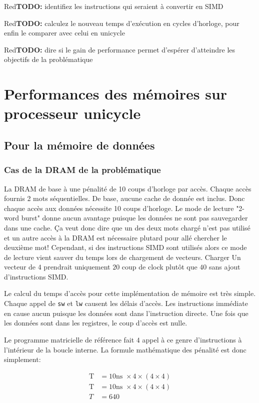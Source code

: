 \documentclass[a11paper]{article}
\newcommand{\todo}[1]{\begin{color}{Red}\textbf{TODO:} #1\end{color}}
\begin{document}
\todo{identifiez les instructions qui seraient à convertir en SIMD}

\todo{calculez le nouveau temps d'exécution en cycles d'horloge, pour enfin le
comparer avec celui en unicycle}

\todo{dire si le gain de performance permet d'espérer d'atteindre les objectifs
de la problématique}



\section{Performances des mémoires sur processeur unicycle}
\subsection{Pour la mémoire de données}
\subsubsection{Cas de la DRAM de la problématique}

La DRAM de base à une pénalité de 10 coups d'horloge par accès. Chaque accès
fournis 2 mots séquentielles. De base, aucune cache de donnée est inclus.
Donc chaque accès aux données nécessite 10 coups d'horloge. Le mode de
lecture "2-word burst" donne aucun avantage puisque les données ne sont pas
sauvegarder dans une cache. Ça veut donc dire que un des deux mots chargé
n'est pas utilisé et un autre accès à la DRAM est nécessaire plutard pour
allé chercher le deuxième mot! Cependant, si des instructions SIMD sont
utilisés alors ce mode de lecture vient sauver du temps lors de chargement de
vecteurs. Charger Un vecteur de $4$ prendrait uniquement $20$ coup de clock
plutôt que $40$ sans ajout d'instructions SIMD.

Le calcul du temps d'accès pour cette implémentation de mémoire est très
simple. Chaque appel de \verb|sw| et \verb|lw| causent les délais d'accès.
Les instructions immédiate en cause aucun puisque les données sont dans
l'instruction directe. Une fois que les données sont dans les registres, le
coup d'accès est nulle.

Le programme matricielle de référence fait $4$ appel à ce genre
d'instructions à l'intérieur de la boucle interne. La formule mathématique
des pénalité est donc simplement:

\begin{align}
  \text{T} &= 10\text{ns }\times4\times(4\times4) \\
  \text{T} &= 10\text{ns }\times4\times(4\times4) \\
  T        &= 640
\end{align}
\end{document}
